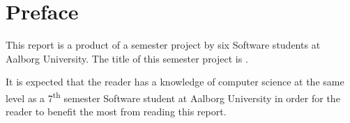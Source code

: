 \chapter*{Preface}
This report is a product of a semester project by six Software students at Aalborg University. The title of this semester project is \projecttheme.

It is expected that the reader has a knowledge of computer science at the same level as a 7\textsuperscript{th} semester Software student at Aalborg University in order for the reader to benefit the most from reading this report.